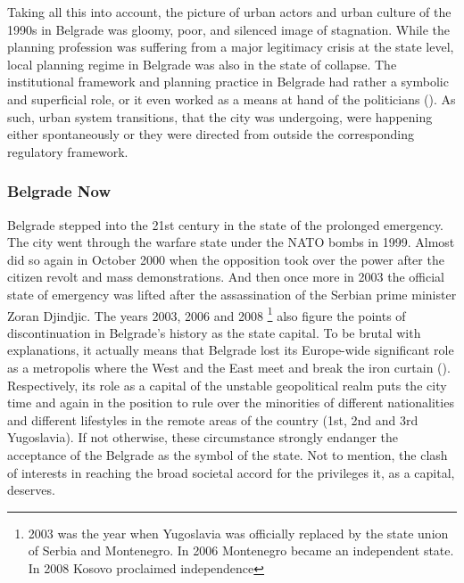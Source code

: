 \documentclass[11pt]{report}
\begin{document}
Taking all this into account, the picture of urban actors and urban culture of the 1990s in Belgrade was gloomy, poor, and silenced image of stagnation.
While the planning profession was suffering from a major legitimacy crisis at the state level, local planning regime in Belgrade was also in the state of collapse.
The institutional framework and planning practice in Belgrade had rather a symbolic and superficial role, or it even worked as a means at hand of the politicians (\href{}{\citealt{vujosevic_planning_2006}}). As such, urban system transitions, that the city was undergoing, were happening either spontaneously or they were directed from outside the corresponding regulatory framework.

\subsubsection{Belgrade Now}
Belgrade stepped into the 21st century in the state of the prolonged emergency.
The city went through the warfare state under the NATO bombs in 1999. Almost did so again in October 2000 when the opposition took over the power after the citizen revolt and mass demonstrations.
And then once more in 2003 the official state of emergency was lifted after the assassination of the Serbian prime minister Zoran Djindjic. The years 2003, 2006 and 2008
\footnote{2003 was the year when Yugoslavia was officially replaced by the state union of Serbia and Montenegro. In 2006 Montenegro became an independent state. In 2008 Kosovo proclaimed independence}
also figure the points of discontinuation in Belgrade's history as the state capital.
To be brutal with explanations, it actually means that Belgrade lost its Europe-wide significant role as a metropolis where the West and the East meet and break the iron curtain (\href{}{\citealt{grozdanic_belgrade_2008}}).
\\

Respectively, its role as a capital of the unstable geopolitical realm puts the city time and again in the position to rule over the minorities of different nationalities and different lifestyles in the remote areas of the country (1st, 2nd and 3rd Yugoslavia). If not otherwise, these circumstance strongly endanger the acceptance of the Belgrade as the symbol of the state. Not to mention, the clash of interests in reaching the broad societal accord for the privileges it, as a capital, deserves.
\\
\end{document}
